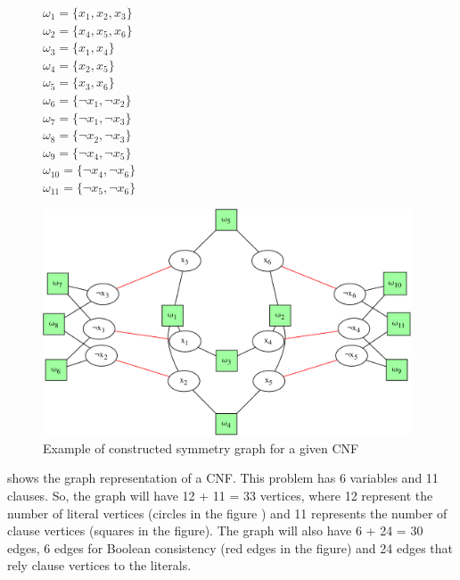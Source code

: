 \begin{figure}[!htbp]
 \begin{minipage}[c]{.2\textwidth}
  $\omega_{1} = \{ x_{1}, x_{2}, x_{3} \}$ \\
  $\omega_{2} = \{ x_{4}, x_{5}, x_{6} \}$ \\
  $\omega_{3} = \{ x_{1}, x_{4} \}$ \\
  $\omega_{4} = \{ x_{2}, x_{5} \}$ \\
  $\omega_{5} = \{ x_{3}, x_{6} \}$ \\
  $\omega_{6} = \{ \neg x_{1}, \neg x_{2} \}$ \\
  $\omega_{7} = \{ \neg x_{1}, \neg x_{3} \}$ \\
  $\omega_{8} = \{ \neg x_{2}, \neg x_{3} \}$ \\
  $\omega_{9} = \{ \neg x_{4}, \neg x_{5} \}$ \\
  $\omega_{10} = \{ \neg x_{4}, \neg x_{6} \}$ \\
  $\omega_{11} = \{ \neg x_{5}, \neg x_{6} \}$ \\
  
 \end{minipage}
 \begin{minipage}[l]{.75\textwidth}
  \includegraphics[width=4.3in]{cnfs/graph_cnf_no_opt-crop}
 \end{minipage}
 \caption{Example of constructed symmetry graph for a given CNF}
 \label{fig:graph_no_opt}
\end{figure}
 shows the graph representation of a CNF. This problem has 6 variables and 11
clauses. So, the graph will have  12  + 11 = 33 vertices, where 12 represent the number of literal vertices (circles in the figure ) 
and 11 represents the number of clause vertices (squares in the figure). The graph will also have 6 + 24 = 30 edges, 6 
edges for Boolean consistency (red edges in the figure) and 24 edges that rely clause vertices to the literals.
